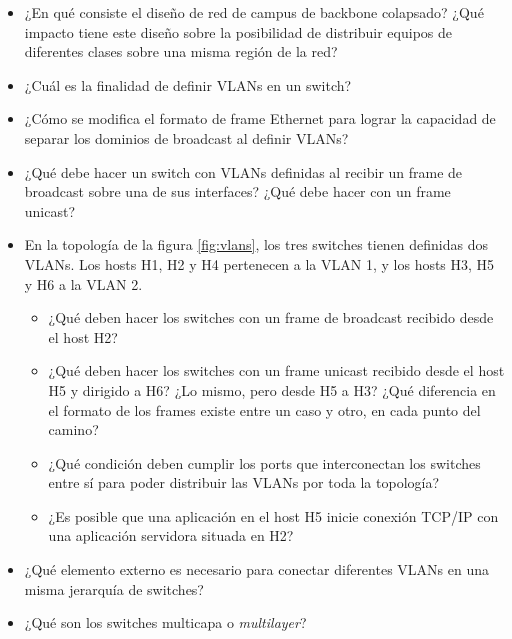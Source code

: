 \begin{itemize}


	\item ¿En qué consiste el diseño de red de campus de backbone colapsado? ¿Qué impacto tiene este diseño sobre la posibilidad de distribuir equipos de diferentes clases sobre una misma región de la red?
	\item 
¿Cuál es la finalidad de definir VLANs en un switch? 

	\item 
¿Cómo se modifica el formato de frame Ethernet para lograr la capacidad de separar los dominios de broadcast al definir VLANs?

	\item ¿Qué debe hacer un switch con VLANs definidas al recibir un frame de broadcast sobre una de sus interfaces? ¿Qué debe hacer con un frame unicast?

	\item En la topología de la figura \ref{fig:vlans}, los tres switches tienen definidas dos VLANs. Los hosts H1, H2 y H4 pertenecen a la VLAN 1, y los hosts H3, H5 y H6 a la VLAN 2. 

	\begin{itemize}
		\item ¿Qué deben hacer los switches con un frame de broadcast recibido desde el host H2?
		\item ¿Qué deben hacer los switches con un frame unicast recibido desde el host H5 y dirigido a H6? ¿Lo mismo, pero desde H5 a H3? ¿Qué diferencia en el formato de los frames existe entre un caso y otro, en cada punto del camino?
		\item ¿Qué condición deben cumplir los ports que interconectan los switches entre sí para poder distribuir las VLANs por toda la topología?
		\item ¿Es posible que una aplicación en el host H5 inicie conexión TCP/IP con una aplicación servidora situada en H2? 
	\end{itemize} 

\item ¿Qué elemento externo es necesario para conectar diferentes VLANs en una misma jerarquía de switches? 
\item ¿Qué son los switches multicapa o \emph{multilayer}? 
\end{itemize} 

